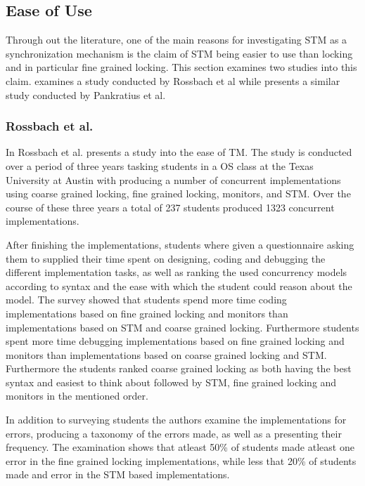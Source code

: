 \subsection{Ease of Use}
Through out the literature, one of the main reasons for investigating \ac{STM} as a synchronization mechanism is the claim of \ac{STM} being easier to use than locking and in particular fine grained locking. This section examines two studies into this claim.  examines a study conducted by Rossbach et al while  presents a similar study conducted by Pankratius et al.
\subsubsection{Rossbach et al.}
\label{sec:stm_ease_rossbach}
In \cite{rossbach2010transactional} Rossbach et al. presents a study into the ease of \ac{TM}. The study is conducted over a period of three years tasking students in a \ac{OS} class at the Texas University at Austin with producing a number of concurrent implementations using coarse grained locking, fine grained locking, monitors, and \ac{STM}. Over the course of these three years a total of 237 students produced 1323 concurrent implementations. 

After finishing the implementations, students where given a questionnaire asking them to supplied their time spent on designing, coding and debugging the different implementation tasks, as well as ranking the used concurrency models according to syntax and the ease with which the student could reason about the model. The survey showed that students spend more time coding implementations based on fine grained locking and monitors than implementations based on \ac{STM} and coarse grained locking\cite[p. 51]{rossbach2010transactional}. Furthermore students spent more time debugging implementations based on fine grained locking and monitors than implementations based on coarse grained locking and \ac{STM}\cite[p. 51]{rossbach2010transactional}. Furthermore the students ranked coarse grained locking as both having the best syntax and easiest to think about followed by \ac{STM}, fine grained locking and monitors in the mentioned order.

In addition to surveying students the authors examine the implementations for errors, producing a taxonomy of the errors made, as well as a presenting their frequency. The examination shows that atleast 50\% of students made atleast one error in the fine grained locking implementations, while less that 20\% of students made and error in the \ac{STM} based implementations. 

